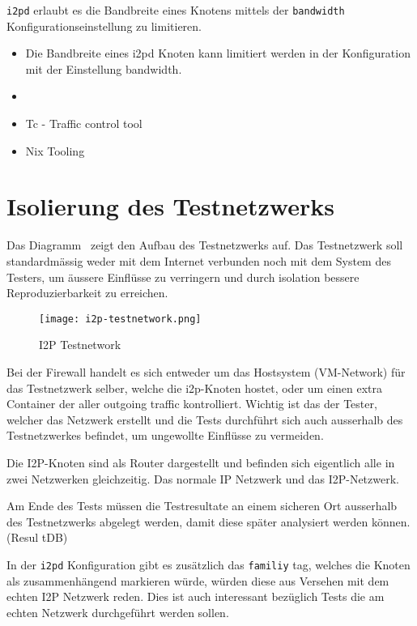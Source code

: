 
\lstinline|i2pd|
erlaubt es die Bandbreite eines Knotens  mittels der \lstinline|bandwidth| Konfigurationseinstellung  zu limitieren.

\begin{itemize}
    \item Die Bandbreite eines i2pd Knoten kann limitiert werden in der Konfiguration mit der Einstellung bandwidth.  
    \item \cite{noauthor_i2p_nodate-3}
    \item Tc - Traffic control tool
    \item Nix Tooling
\end{itemize}

\section{Isolierung des Testnetzwerks}
\label{sec:isolierung}


Das Diagramm~ zeigt den Aufbau des Testnetzwerks auf. Das Testnetzwerk soll standardmässig weder mit dem Internet verbunden noch mit dem System des Testers, um äussere Einflüsse zu verringern und durch isolation bessere Reproduzierbarkeit zu erreichen.

\begin{figure*}[ht]
  \texttt{[image: i2p-testnetwork.png]}
  \caption{I2P Testnetwork}\label{fig:i2p-testnetwork}
\end{figure*}

Bei der Firewall handelt es sich entweder um das Hostsystem (VM-Network) für das Testnetzwerk selber, welche die i2p-Knoten hostet, oder um einen extra Container der aller outgoing traffic kontrolliert.
Wichtig ist das der Tester, welcher das Netzwerk erstellt und die Tests durchführt sich auch ausserhalb des Testnetzwerkes befindet, um ungewollte Einflüsse zu vermeiden.

Die I2P-Knoten sind als Router dargestellt und befinden sich eigentlich alle in zwei Netzwerken gleichzeitig. Das normale IP Netzwerk und das I2P-Netzwerk.

Am Ende des Tests müssen die Testresultate an einem sicheren Ort ausserhalb des Testnetzwerks abgelegt werden, damit diese später analysiert werden können. (Resul tDB)

In der \lstinline|i2pd| Konfiguration gibt es zusätzlich das \lstinline|familiy| tag, welches die Knoten als zusammenhängend markieren würde, würden diese aus Versehen mit dem echten I2P Netzwerk reden. Dies ist auch interessant bezüglich Tests die am echten Netzwerk durchgeführt werden sollen.

